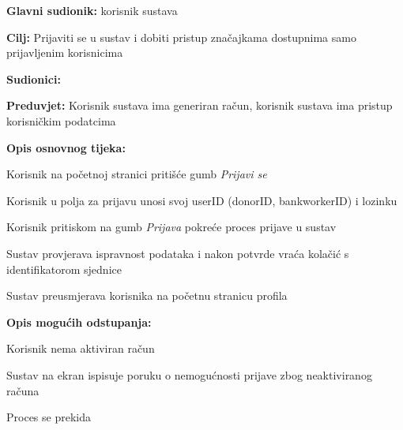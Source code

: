 					\noindent {}
					\begin{packed_item}  \label{UC3.1}
	
						\item \textbf{Glavni sudionik: }korisnik sustava
						\item  \textbf{Cilj:} Prijaviti se u sustav i dobiti pristup značajkama dostupnima samo prijavljenim korisnicima
						\item  \textbf{Sudionici:} 
						\item  \textbf{Preduvjet:} Korisnik sustava ima generiran račun, korisnik sustava ima pristup korisničkim podatcima
						\item  \textbf{Opis osnovnog tijeka:}
						
						\item[] \begin{packed_enum}
	                        \item Korisnik na početnoj stranici pritišće gumb \textit{Prijavi se}
	                        \item Korisnik u polja za prijavu unosi svoj userID (donorID, bankworkerID) i lozinku
	                        \item Korisnik pritiskom na gumb \textit{Prijava} pokreće proces prijave u sustav
	                        \item Sustav provjerava ispravnost podataka i nakon potvrde vraća kolačić s identifikatorom sjednice
	                        \item Sustav preusmjerava korisnika na početnu stranicu profila
						\end{packed_enum}
						
						\item  \textbf{Opis mogućih odstupanja:}
						\item[] \begin{packed_enum}
						
	                        \item[4.a] Korisnik nema aktiviran račun
	                        \item[] \begin{packed_enum}
    	                        \item Sustav na ekran ispisuje poruku o nemogućnosti prijave zbog neaktiviranog računa
    	                        \item Proces se prekida
					    	\end{packed_enum}
					    	

\end{packed_enum}
\end{packed_item}
